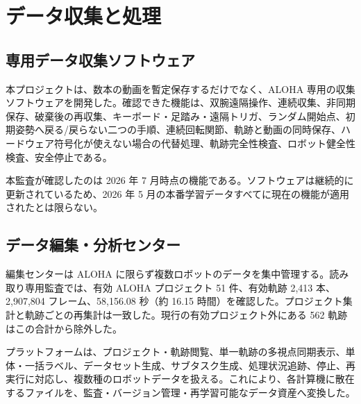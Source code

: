 \chapter{データ収集と処理}

\section{専用データ収集ソフトウェア}

本プロジェクトは、数本の動画を暫定保存するだけでなく、ALOHA 専用の収集ソフトウェアを開発した。確認できた機能は、双腕遠隔操作、連続収集、非同期保存、破棄後の再収集、キーボード・足踏み・遠隔トリガ、ランダム開始点、初期姿勢へ戻る/戻らない二つの手順、連続回転関節、軌跡と動画の同時保存、ハードウェア符号化が使えない場合の代替処理、軌跡完全性検査、ロボット健全性検査、安全停止である。


本監査が確認したのは 2026 年 7 月時点の機能である。ソフトウェアは継続的に更新されているため、2026 年 5 月の本番学習データすべてに現在の機能が適用されたとは限らない。

\section{データ編集・分析センター}

編集センターは ALOHA に限らず複数ロボットのデータを集中管理する。読み取り専用監査では、有効 ALOHA プロジェクト 51 件、有効軌跡 2,413 本、2,907,804 フレーム、58,156.08 秒（約 16.15 時間）を確認した。プロジェクト集計と軌跡ごとの再集計は一致した。現行の有効プロジェクト外にある 562 軌跡はこの合計から除外した。

プラットフォームは、プロジェクト・軌跡閲覧、単一軌跡の多視点同期表示、単体・一括ラベル、データセット生成、サブタスク生成、処理状況追跡、停止、再実行に対応し、複数種のロボットデータを扱える。これにより、各計算機に散在するファイルを、監査・バージョン管理・再学習可能なデータ資産へ変換した。

